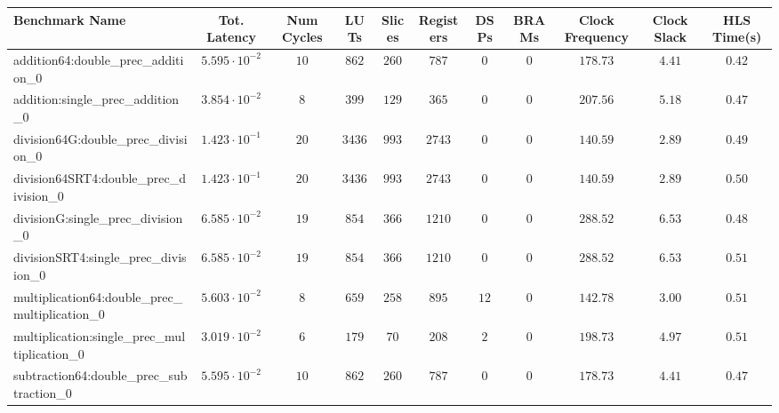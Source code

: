 \begin{tabular}{|l|c|c|c|c|c|c|c|c|c|c|}
\hline
Benchmark Name                                   & Tot. Latency            & Num Cycles & LUTs      & Slices   & Registers & DSPs   & BRAMs & Clock Frequency & Clock Slack & HLS Time(s) \\
\hline
addition64:double\_prec\_addition\_0             & $ 5.595 \cdot 10^{-2} $ & $ 10     $ & $ 862   $ & $ 260  $ & $ 787   $ & $ 0  $ & $ 0 $ & $ 178.73      $ & $ 4.41    $ & $ 0.42    $ \\
addition:single\_prec\_addition\_0               & $ 3.854 \cdot 10^{-2} $ & $ 8      $ & $ 399   $ & $ 129  $ & $ 365   $ & $ 0  $ & $ 0 $ & $ 207.56      $ & $ 5.18    $ & $ 0.47    $ \\
division64G:double\_prec\_division\_0            & $ 1.423 \cdot 10^{-1} $ & $ 20     $ & $ 3436  $ & $ 993  $ & $ 2743  $ & $ 0  $ & $ 0 $ & $ 140.59      $ & $ 2.89    $ & $ 0.49    $ \\
division64SRT4:double\_prec\_division\_0         & $ 1.423 \cdot 10^{-1} $ & $ 20     $ & $ 3436  $ & $ 993  $ & $ 2743  $ & $ 0  $ & $ 0 $ & $ 140.59      $ & $ 2.89    $ & $ 0.50    $ \\
divisionG:single\_prec\_division\_0              & $ 6.585 \cdot 10^{-2} $ & $ 19     $ & $ 854   $ & $ 366  $ & $ 1210  $ & $ 0  $ & $ 0 $ & $ 288.52      $ & $ 6.53    $ & $ 0.48    $ \\
divisionSRT4:single\_prec\_division\_0           & $ 6.585 \cdot 10^{-2} $ & $ 19     $ & $ 854   $ & $ 366  $ & $ 1210  $ & $ 0  $ & $ 0 $ & $ 288.52      $ & $ 6.53    $ & $ 0.51    $ \\
multiplication64:double\_prec\_multiplication\_0 & $ 5.603 \cdot 10^{-2} $ & $ 8      $ & $ 659   $ & $ 258  $ & $ 895   $ & $ 12 $ & $ 0 $ & $ 142.78      $ & $ 3.00    $ & $ 0.51    $ \\
multiplication:single\_prec\_multiplication\_0   & $ 3.019 \cdot 10^{-2} $ & $ 6      $ & $ 179   $ & $ 70   $ & $ 208   $ & $ 2  $ & $ 0 $ & $ 198.73      $ & $ 4.97    $ & $ 0.51    $ \\
subtraction64:double\_prec\_subtraction\_0       & $ 5.595 \cdot 10^{-2} $ & $ 10     $ & $ 862   $ & $ 260  $ & $ 787   $ & $ 0  $ & $ 0 $ & $ 178.73      $ & $ 4.41    $ & $ 0.47    $ \\

\end{tabular}
